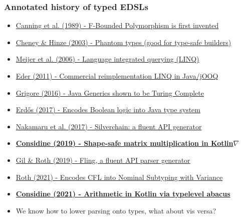 \documentclass{beamer}
\begin{document}
    \begin{frame}
        \frametitle{Annotated history of typed EDSLs}
        \begin{itemize}
            \item \href{https://www.cs.utexas.edu/~wcook/papers/FBound89/CookFBound89.pdf}{Canning et al. (1989) - F-Bounded Polymorphism is first invented}
            \item \href{https://ecommons.cornell.edu/bitstream/handle/1813/5614/TR2003-1901.pdf}{Cheney \& Hinze (2003) - Phantom types (good for type-safe builders)}
            \item \href{https://dl.acm.org/doi/pdf/10.1145/1142473.1142552}{Meijer et al. (2006) - Language integrated querying (LINQ)}
            \item \href{https://jooq.org}{Eder (2011) - Commercial reimplementation LINQ in Java/jOOQ}
            \item \href{https://arxiv.org/pdf/1605.05274.pdf}{Grigore (2016) - Java Generics shown to be Turing Complete}
            \item \href{https://github.com/erdos/java-logic}{Erdős (2017) - Encodes Boolean logic into Java type system}
            \item \href{https://dl.acm.org/doi/10.1145/3136040.3136041}{Nakamaru et al. (2017) - Silverchain: a fluent API generator}
            \item \href{http://breandan.net/public/masters_thesis.pdf#2}{\textbf{Considine (2019) - Shape-safe matrix multiplication in Kotlin$\nabla$}}
            \item \href{https://drops.dagstuhl.de/opus/volltexte/2019/10805/pdf/LIPIcs-ECOOP-2019-13.pdf}{Gil \& Roth (2019) - Fling, a fluent API parser generator}
            \item \href{https://arxiv.org/pdf/2109.03950.pdf}{Roth (2021) - Encodes CFL into Nominal Subtyping with Variance}
            \item \href{https://github.com/breandan/galoisenne}{\textbf{Considine (2021) - Arithmetic in Kotlin via typelevel abacus}}
            \item We know how to lower parsing onto types, what about vis versa?
        \end{itemize}
    \end{frame}
\end{document}
